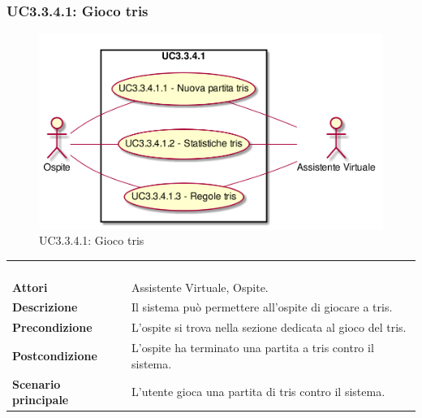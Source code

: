 \newpage\subsubsection{UC3.3.4.1: Gioco tris}
\label{UC3.3.4.1}
\begin{figure}[h]
\centering
\includegraphics[width=\textwidth,height=\textheight,keepaspectratio]{images/UseCaseUC3341.png}
\caption{UC3.3.4.1: Gioco tris}
\end{figure}
\begin{longtable}{l|p{10cm}}
\rowcolor[gray]{0.8} \multicolumn{2}{c}{} \\
\rowcolor[gray]{0.8} \multicolumn{2}{c}{\textbf{UC3.3.4.1 - Gioco tris}} \\
\rowcolor[gray]{0.8} \multicolumn{2}{c}{} \\
\hline
&\\
\textbf{Attori} & Assistente Virtuale, Ospite.\\[7pt]
\textbf{Descrizione} & Il sistema può permettere all'ospite di giocare a tris.\\[7pt]
\textbf{Precondizione} & L'ospite si trova nella sezione dedicata al gioco del tris.\\[7pt]
\textbf{Postcondizione} & L'ospite ha terminato una partita a tris contro il sistema.\\[7pt]
\textbf{Scenario principale} &L'utente gioca una partita di tris contro il sistema.\\[7pt]\hline
\end{longtable}

